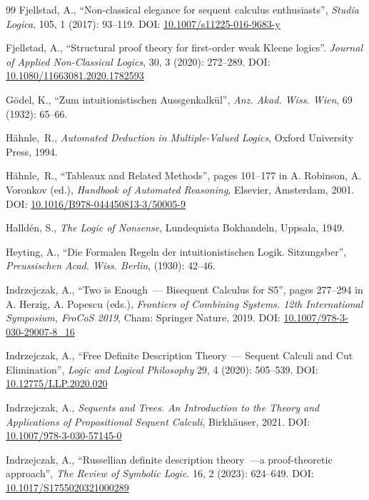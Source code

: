 \documentclass[10pt,a4paper]{article}
\theoremstyle{definition}
\newcommand{\3}{\vspace{.3in}}
\newcommand{\2}{\vspace{.2in}}
\newcommand{\1}{\vspace{.1in}}
\newcommand{\5}{\vspace{.05in}}
\newcommand\DOI[2]{DOI: \href{#1#2}{#2}}
\begin{document}
\begin{thebibliography}{99}
Fjellstad, A., ``Non-classical elegance for sequent calculus enthusiasts'', \textit{Studia Logica}, 105, 1 (2017): 93--119. \DOI{http://dx.doi.org/}{10.1007/s11225-016-9683-y}

Fjellstad, A., ``Structural proof theory for first-order weak Kleene logics''. \textit{Journal of Applied Non-Classical Logics}, 30, 3 (2020): 272--289. \DOI{http://dx.doi.org/}{10.1080/11663081.2020.1782593}

G\"{o}del, K.,  
``Zum intuitionistischen Aussgenkalk\"{u}l'', \textit{Anz. Akad. Wiss. Wien},  69 (1932): 65--66.

H\"ahnle,~R., \textit{Automated Deduction in Multiple-Valued Logics}, Oxford University Press, 1994.

H\"ahnle,~R., ``Tableaux and Related Methods'', pages 101--177 
in A. Robinson, A. Voronkov (ed.), \textit{Handbook of Automated Reasoning}, Elsevier, Amsterdam, 2001.
\DOI{http://dx.doi.org/}{10.1016/B978-044450813-3/50005-9}


Halld\'{e}n, S., \textit{The Logic of Nonsense}, Lundequista Bokhandeln, Uppsala, 1949.


Heyting, A., 
``Die Formalen Regeln der intuitionistischen Logik. Sitzungsber'',  \textit{Preussischen Acad. Wiss. Berlin},  (1930): 42--46.

Indrzejczak, A., ``Two is Enough~--- Bisequent Calculus for S5'', pages 277--294 in A. Herzig, A. Popescu (eds.), \textit{Frontiers of Combining Systems. 12th International Symposium, FroCoS 2019}, Cham: Springer Nature, 2019.
\DOI{http://dx.doi.org/}{10.1007/978-3-030-29007-8\_16}

	Indrzejczak, A., ``Free Definite Description Theory~--- Sequent Calculi and Cut Elimination'', \textit{Logic and Logical Philosophy} 29, 4 (2020): 505--539.
\DOI{http://dx.doi.org/}{10.12775/LLP.2020.020}

Indrzejczak, A., \textit{Sequents and Trees. An Introduction to the Theory and Applications of Propositional Sequent Calculi}, Birkh\"auser, 2021.
\DOI{http://dx.doi.org/}{10.1007/978-3-030-57145-0}

	Indrzejczak, A., ``Russellian definite description theory~---{a} proof-theoretic approach'',  
	\textit{The Review of Symbolic Logic}. 16, 2 (2023): 624--649. \DOI{http://dx.doi.org/}{10.1017/S1755020321000289}



\end{thebibliography}
\end{document}
